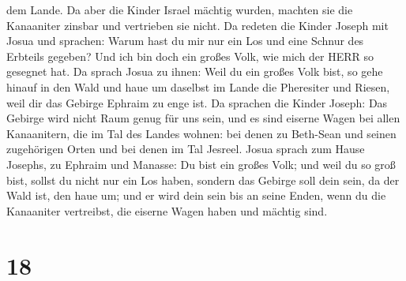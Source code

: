 dem Lande.  Da aber die Kinder Israel mächtig wurden,
machten sie die Kanaaniter zinsbar und vertrieben sie nicht.
 Da redeten die Kinder Joseph mit Josua und sprachen: Warum
hast du mir nur ein Los und eine Schnur des Erbteils gegeben? Und ich
bin doch ein großes Volk, wie mich der HERR so gesegnet hat.
 Da sprach Josua zu ihnen: Weil du ein großes Volk bist, so
gehe hinauf in den Wald und haue um daselbst im Lande die Pheresiter und
Riesen, weil dir das Gebirge Ephraim zu enge ist.  Da
sprachen die Kinder Joseph: Das Gebirge wird nicht Raum genug für uns
sein, und es sind eiserne Wagen bei allen Kanaanitern, die im Tal des
Landes wohnen: bei denen zu Beth-Sean und seinen zugehörigen Orten und
bei denen im Tal Jesreel.  Josua sprach zum Hause Josephs,
zu Ephraim und Manasse: Du bist ein großes Volk; und weil du so groß
bist, sollst du nicht nur ein Los haben,  sondern das
Gebirge soll dein sein, da der Wald ist, den haue um; und er wird dein
sein bis an seine Enden, wenn du die Kanaaniter vertreibst, die eiserne
Wagen haben und mächtig sind.

\hypertarget{section-17}{%
\section{18}\label{section-17}}

